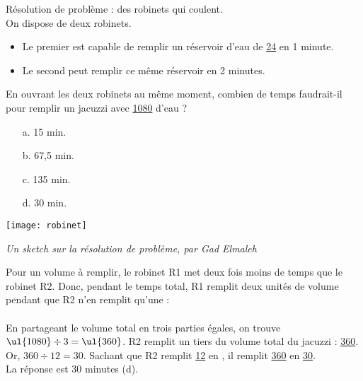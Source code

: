 \begin{colonne*exercice}
\bigskip


\begin{exercice} %
   Résolution de problème : des robinets qui coulent. \\
   On dispose de deux robinets.
   \begin{itemize}
      \item Le premier est capable de remplir un réservoir d’eau de \ul{24} en 1 minute.
      \item Le second peut remplir ce même réservoir en 2 minutes.
   \end{itemize}
   En ouvrant les deux robinets au même moment, combien de temps faudrait-il pour remplir un jacuzzi avec \ul{1080} d’eau ? \\
   \begin{minipage}{4cm}
      \begin{enumerate}
         \item[a.] 15 min.
         \item[b.] 67,5 min.
         \item[c.] 135 min.
         \item[d.] 30 min.
      \end{enumerate}
   \end{minipage}
   \begin{minipage}{3cm}
      \texttt{[image: robinet]}
   \end{minipage}
   
   \qquad
   \begin{minipage}{2cm}
   \end{minipage}
   \qquad
   \begin{minipage}{4.2cm}
      {\it Un sketch sur la résolution de problème, par Gad Elmaleh}
   \end{minipage}
\end{exercice}

\begin{corrige}
   Pour un volume à remplir, le robinet R1 met deux fois moins de temps que le robinet R2. Donc, pendant le temps total, R1 remplit deux \og unités de volume \fg{} pendant que R2 n'en remplit qu’une : \\ [1mm]
    \\
   En partageant le volume total en trois parties égales, on trouve $\ul{1080}\div3 =\ul{360}$.
   R2 remplit un tiers du volume total du jacuzzi : \ul{360}. \\
   Or, $360\div12 =30$. Sachant que R2 remplit \ul{12} en , il remplit \ul{360} en \ul{30}. \\
   {\blue La réponse est 30 minutes (d)}. \bigskip
\end{corrige}

\end{colonne*exercice}


